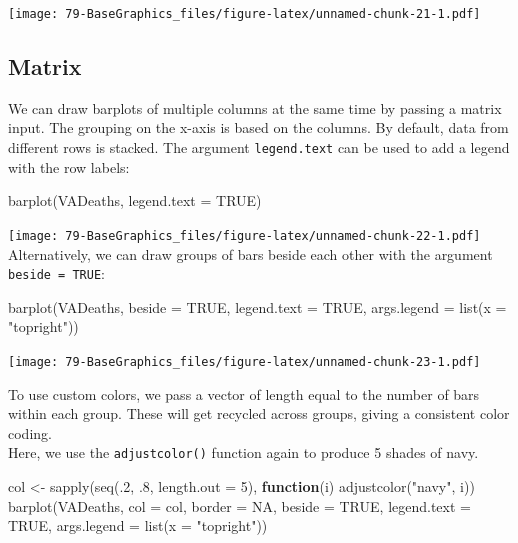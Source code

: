 \documentclass[
]{book}
\newenvironment{Shaded}{\begin{snugshade}}{\end{snugshade}}
\newcommand{\AttributeTok}[1]{\textcolor[rgb]{0.77,0.63,0.00}{#1}}
\newcommand{\ConstantTok}[1]{\textcolor[rgb]{0.00,0.00,0.00}{#1}}
\newcommand{\ControlFlowTok}[1]{\textcolor[rgb]{0.13,0.29,0.53}{\textbf{#1}}}
\newcommand{\DecValTok}[1]{\textcolor[rgb]{0.00,0.00,0.81}{#1}}
\newcommand{\FunctionTok}[1]{\textcolor[rgb]{0.00,0.00,0.00}{#1}}
\newcommand{\NormalTok}[1]{#1}
\newcommand{\OtherTok}[1]{\textcolor[rgb]{0.56,0.35,0.01}{#1}}
\newcommand{\StringTok}[1]{\textcolor[rgb]{0.31,0.60,0.02}{#1}}
\begin{document}
\texttt{[image: 79-BaseGraphics\_files/figure-latex/unnamed-chunk-21-1.pdf]}

\hypertarget{matrix}{%
\subsection{Matrix}\label{matrix}}

We can draw barplots of multiple columns at the same time by passing a matrix input. The grouping on the x-axis is based on the columns. By default, data from different rows is stacked. The argument \texttt{legend.text} can be used to add a legend with the row labels:

\begin{Shaded}
\begin{Highlighting}[]
\FunctionTok{barplot}\NormalTok{(VADeaths, }\AttributeTok{legend.text =} \ConstantTok{TRUE}\NormalTok{)}
\end{Highlighting}
\end{Shaded}

\texttt{[image: 79-BaseGraphics\_files/figure-latex/unnamed-chunk-22-1.pdf]}
Alternatively, we can draw groups of bars beside each other with the argument \texttt{beside\ =\ TRUE}:

\begin{Shaded}
\begin{Highlighting}[]
\FunctionTok{barplot}\NormalTok{(VADeaths, }\AttributeTok{beside =} \ConstantTok{TRUE}\NormalTok{,}
        \AttributeTok{legend.text =} \ConstantTok{TRUE}\NormalTok{, }\AttributeTok{args.legend =} \FunctionTok{list}\NormalTok{(}\AttributeTok{x =} \StringTok{"topright"}\NormalTok{))}
\end{Highlighting}
\end{Shaded}

\texttt{[image: 79-BaseGraphics\_files/figure-latex/unnamed-chunk-23-1.pdf]}

To use custom colors, we pass a vector of length equal to the number of bars within each group. These will get recycled across groups, giving a consistent color coding.\\
Here, we use the \texttt{adjustcolor()} function again to produce 5 shades of navy.

\begin{Shaded}
\begin{Highlighting}[]
\NormalTok{col }\OtherTok{\textless{}{-}} \FunctionTok{sapply}\NormalTok{(}\FunctionTok{seq}\NormalTok{(.}\DecValTok{2}\NormalTok{, .}\DecValTok{8}\NormalTok{, }\AttributeTok{length.out =} \DecValTok{5}\NormalTok{), }\ControlFlowTok{function}\NormalTok{(i) }\FunctionTok{adjustcolor}\NormalTok{(}\StringTok{"navy"}\NormalTok{, i))}
\FunctionTok{barplot}\NormalTok{(VADeaths,}
        \AttributeTok{col =}\NormalTok{ col,}
        \AttributeTok{border =} \ConstantTok{NA}\NormalTok{,}
        \AttributeTok{beside =} \ConstantTok{TRUE}\NormalTok{,}
        \AttributeTok{legend.text =} \ConstantTok{TRUE}\NormalTok{, }\AttributeTok{args.legend =} \FunctionTok{list}\NormalTok{(}\AttributeTok{x =} \StringTok{"topright"}\NormalTok{))}
\end{Highlighting}
\end{Shaded}
\end{document}
